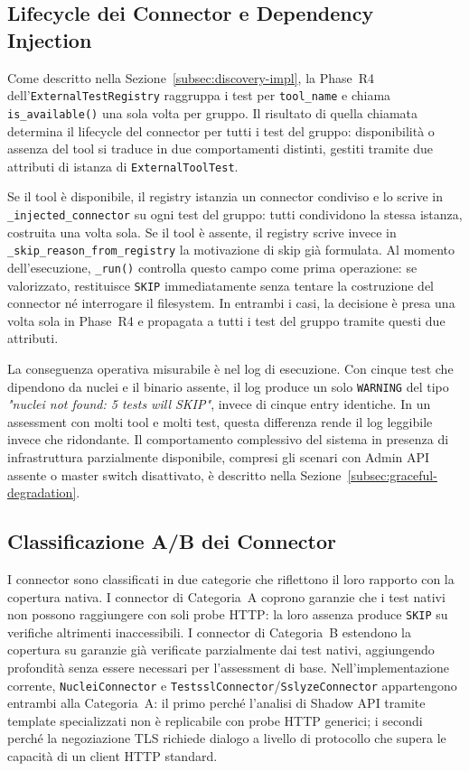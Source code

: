 \subsection{Lifecycle dei Connector e Dependency Injection}\label{subsec:connector-injection}

Come descritto nella Sezione~\ref{subsec:discovery-impl}, la Phase~R4 dell'\texttt{ExternalTestRegistry} raggruppa i test per \texttt{tool\_name} e chiama \texttt{is\_available()} una sola volta per gruppo. Il risultato di quella chiamata determina il lifecycle del connector per tutti i test del gruppo: disponibilità o assenza del tool si traduce in due comportamenti distinti, gestiti tramite due attributi di istanza di \texttt{ExternalToolTest}.

Se il tool è disponibile, il registry istanzia un connector condiviso e lo scrive in \texttt{\_injected\_connector} su ogni test del gruppo: tutti condividono la stessa istanza, costruita una volta sola. Se il tool è assente, il registry scrive invece in \texttt{\_skip\_reason\_from\_registry} la motivazione di skip già formulata. Al momento dell'esecuzione, \texttt{\_run()} controlla questo campo come prima operazione: se valorizzato, restituisce \texttt{SKIP} immediatamente senza tentare la costruzione del connector né interrogare il filesystem. In entrambi i casi, la decisione è presa una volta sola in Phase~R4 e propagata a tutti i test del gruppo tramite questi due attributi.

La conseguenza operativa misurabile è nel log di esecuzione. Con cinque test che dipendono da nuclei e il binario assente, il log produce un solo \texttt{WARNING} del tipo \textit{"nuclei not found: 5 tests will SKIP"}, invece di cinque entry identiche. In un assessment con molti tool e molti test, questa differenza rende il log leggibile invece che ridondante. Il comportamento complessivo del sistema in presenza di infrastruttura parzialmente disponibile, compresi gli scenari con Admin \gls{API} assente o master switch disattivato, è descritto nella Sezione~\ref{subsec:graceful-degradation}.


\subsection{Classificazione A/B dei Connector}\label{subsec:connector-classification}

I connector sono classificati in due categorie che riflettono il loro rapporto con la copertura nativa. I connector di Categoria~A coprono garanzie che i test nativi non possono raggiungere con soli probe \gls{HTTP}: la loro assenza produce \texttt{SKIP} su verifiche altrimenti inaccessibili. I connector di Categoria~B estendono la copertura su garanzie già verificate parzialmente dai test nativi, aggiungendo profondità senza essere necessari per l'assessment di base. Nell'implementazione corrente, \texttt{NucleiConnector} e \texttt{TestsslConnector}/\texttt{SslyzeConnector} appartengono entrambi alla Categoria~A: il primo perché l'analisi di Shadow \gls{API} tramite template specializzati non è replicabile con probe \gls{HTTP} generici; i secondi perché la negoziazione \gls{TLS} richiede dialogo a livello di protocollo che supera le capacità di un client \gls{HTTP} standard.


